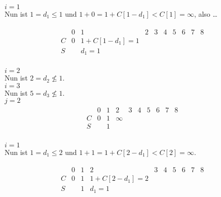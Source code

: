 \begin{solution}
\begin{enumerate}[label = \alph*]
\begin{enumerate}[label = \arabic*.]
    \underline{$i = 1$} \\
    Nun ist $1 = d_1 \leq 1$ und $1 + 0 = 1 + C[1 - d_1] < C[1] = \infty$, also …

    \begin{align*}
      \begin{array}{c|c|c|c|c|c|c|c|c|c}
          & 0 & 1                  & 2 & 3 & 4 & 5 & 6 & 7 & 8 \\ \hline
        C & 0 & 1 + C[1 - d_1] = 1 &   &   &   &   &   &   &   \\ \hline
        S &   & d_1 = 1            &   &   &   &   &   &   &   \\
      \end{array}
    \end{align*}

    \underline{$i = 2$} \\
    Nun ist $2 = d_2 \not \leq 1$. \\

    \underline{$i = 3$} \\
    Nun ist $5 = d_3 \not \leq 1$. \\

    \underline{$j = 2$} \\

    \begin{align*}
      \begin{array}{c|c|c|c|c|c|c|c|c|c}
          & 0 & 1 & 2      & 3 & 4 & 5 & 6 & 7 & 8 \\ \hline
        C & 0 & 1 & \infty &   &   &   &   &   &   \\ \hline
        S &   & 1 &        &   &   &   &   &   &   \\
      \end{array}
    \end{align*}

    \underline{$i = 1$} \\
    Nun ist $1 = d_1 \leq 2$ und $1 + 1 = 1 + C[2 - d_1] < C[2] = \infty$.

    \begin{align*}
      \begin{array}{c|c|c|c|c|c|c|c|c|c}
          & 0 & 1 & 2                  & 3 & 4 & 5 & 6 & 7 & 8 \\ \hline
        C & 0 & 1 & 1 + C[2 - d_1] = 2 &   &   &   &   &   &   \\ \hline
        S &   & 1 & d_1 = 1            &   &   &   &   &   &   \\
      \end{array}
    \end{align*}


\end{enumerate}
\end{enumerate}
\end{solution}

